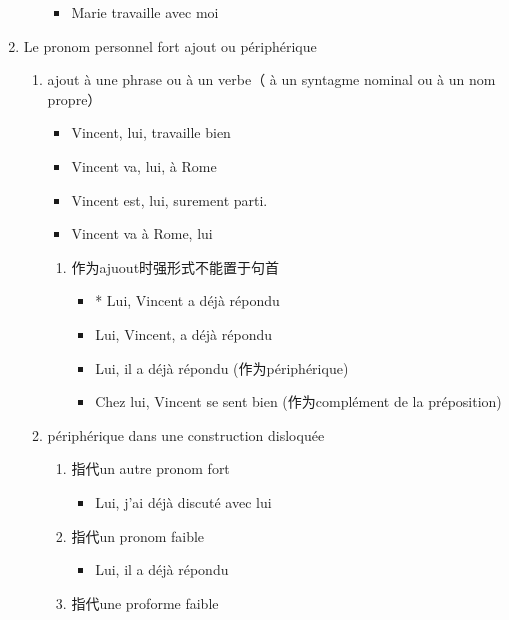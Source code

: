 \documentclass[UTF8]{report}
\begin{document}
\begin{enumerate}
\begin{enumerate}
\begin{itemize}
            \item Marie travaille avec moi
        \end{itemize}
    \end{enumerate}
    \item Le pronom personnel fort ajout ou périphérique
    \begin{enumerate}
        \item ajout à une phrase ou à un verbe（ à un syntagme nominal ou à un nom propre）
        \begin{itemize}
            \item Vincent, lui, travaille bien
            \item Vincent va, lui, à Rome
            \item Vincent est, lui, surement parti.
            \item Vincent va à Rome, lui
        \end{itemize}
        \begin{enumerate}
            \item 作为ajuout时强形式不能置于句首
            \begin{itemize}
                \item * Lui, Vincent a déjà répondu
                \item Lui, Vincent, a déjà répondu
                \item Lui, il a déjà répondu (作为périphérique)
                \item Chez lui, Vincent se sent bien (作为complément de la préposition)
            \end{itemize}
        \end{enumerate}
        \item périphérique dans une construction disloquée
        \begin{enumerate}
            \item 指代un autre pronom fort
            \begin{itemize}
                \item Lui, j’ai déjà discuté avec lui
            \end{itemize}
            \item 指代un pronom faible
            \begin{itemize}
                \item Lui, il a déjà répondu
            \end{itemize}
            \item 指代une proforme faible
            \begin{itemize}

\end{itemize}
\end{enumerate}
\end{enumerate}
\end{enumerate}
\end{document}
